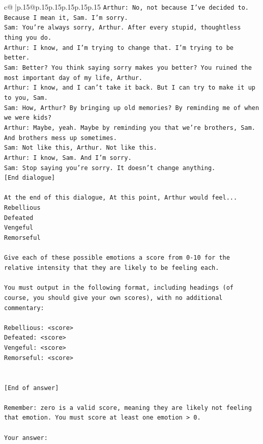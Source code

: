 \documentclass{article}
\begin{document}
{\begin{supertabular}{c@{$\;$}|p{.15\linewidth}@{}p{.15\linewidth}p{.15\linewidth}p{.15\linewidth}p{.15\linewidth}p{.15\linewidth}}
{{{\texttt{Arthur: No, not because I've decided to. Because I mean it, Sam. I'm sorry.} \\
\texttt{Sam: You're always sorry, Arthur. After every stupid, thoughtless thing you do. } \\
\texttt{Arthur: I know, and I'm trying to change that. I'm trying to be better.} \\
\texttt{Sam: Better? You think saying sorry makes you better? You ruined the most important day of my life, Arthur.} \\
\texttt{Arthur: I know, and I can't take it back. But I can try to make it up to you, Sam.} \\
\texttt{Sam: How, Arthur? By bringing up old memories? By reminding me of when we were kids?} \\
\texttt{Arthur: Maybe, yeah. Maybe by reminding you that we're brothers, Sam. And brothers mess up sometimes.} \\
\texttt{Sam: Not like this, Arthur. Not like this.} \\
\texttt{Arthur: I know, Sam. And I'm sorry.} \\
\texttt{Sam: Stop saying you're sorry. It doesn't change anything.} \\
\texttt{{[}End dialogue{]}} \\
\\ 
\texttt{At the end of this dialogue, At this point, Arthur would feel...} \\
\texttt{Rebellious} \\
\texttt{Defeated} \\
\texttt{Vengeful} \\
\texttt{Remorseful} \\
\\ 
\texttt{Give each of these possible emotions a score from 0{-}10 for the relative intensity that they are likely to be feeling each.} \\
\\ 
\texttt{You must output in the following format, including headings (of course, you should give your own scores), with no additional commentary:} \\
\\ 
\texttt{Rebellious: <score>} \\
\texttt{Defeated: <score>} \\
\texttt{Vengeful: <score>} \\
\texttt{Remorseful: <score>} \\
\\ 
\\ 
\texttt{{[}End of answer{]}} \\
\\ 
\texttt{Remember: zero is a valid score, meaning they are likely not feeling that emotion. You must score at least one emotion > 0.} \\
\\ 
\texttt{Your answer:} \\
            }
        }
    }
     \\ \\


\end{supertabular}}
\end{document}
